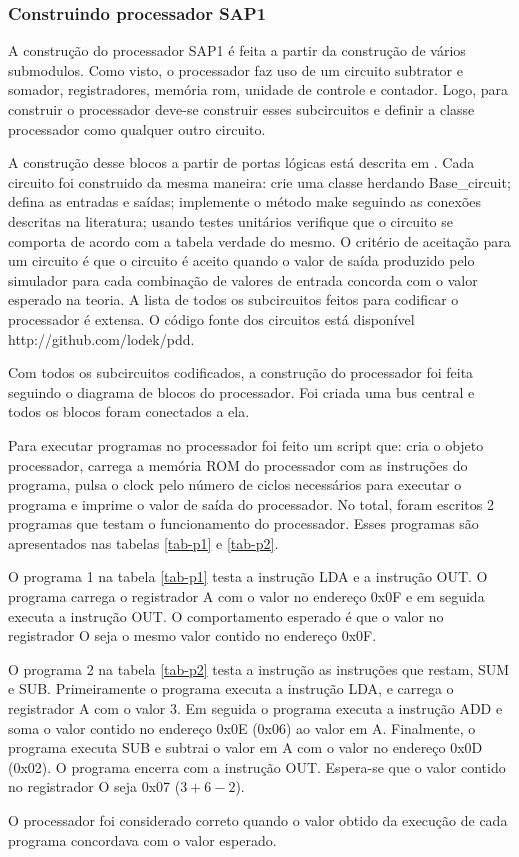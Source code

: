 \subsubsection{Construindo processador SAP1}
A construção do processador SAP1 é feita a partir da construção de vários submodulos.
Como visto, o processador faz uso de um circuito subtrator e somador, registradores, memória rom, unidade de controle e contador.
Logo, para construir o processador deve-se construir esses subcircuitos e definir a classe processador como qualquer outro circuito.

A construção desse blocos a partir de portas lógicas está descrita em \cite{harris}.
Cada circuito foi construido da mesma maneira: crie uma classe herdando Base\_circuit; defina as entradas e saídas; implemente o método make seguindo as conexões descritas na literatura; usando testes unitários verifique que o circuito se comporta de acordo com a tabela verdade do mesmo.
O critério de aceitação para um circuito é que o circuito é aceito quando o valor de saída produzido pelo simulador para cada combinação de valores de entrada concorda com o valor esperado na teoria.
A lista de todos os subcircuitos feitos para codificar o processador é extensa.
O código fonte dos circuitos está disponível http://github.com/lodek/pdd.

Com todos os subcircuitos codificados, a construção do processador foi feita seguindo o diagrama de blocos do processador.
Foi criada uma bus central e todos os blocos foram conectados a ela.

Para executar programas no processador foi feito um script que: cria o objeto processador, carrega a memória ROM do processador com as instruções do programa, pulsa o clock pelo número de ciclos necessários para executar o programa e imprime o valor de saída do processador.
No total, foram escritos 2 programas que testam o funcionamento do processador.
Esses programas são apresentados nas tabelas \ref{tab-p1} e \ref{tab-p2}.



O programa 1 na tabela \ref{tab-p1} testa a instrução LDA e a instrução OUT.
O programa carrega o registrador A com o valor no endereço 0x0F e em seguida executa a instrução OUT.
O comportamento esperado é que o valor no registrador O seja o mesmo valor contido no endereço 0x0F.

O programa 2 na tabela \ref{tab-p2} testa a instrução as instruções que restam, SUM e SUB.
Primeiramente o programa executa a instrução LDA, e carrega o registrador A com o valor $3$.
Em seguida o programa executa a instrução ADD e soma o valor contido no endereço 0x0E (0x06) ao valor em A.
Finalmente, o programa executa SUB e subtrai o valor em A com o valor no endereço 0x0D (0x02). 
O programa encerra com a instrução OUT.
Espera-se que o valor contido no registrador O seja 0x07 ($3+6-2$).

O processador foi considerado correto quando o valor obtido da execução de cada programa concordava com o valor esperado.

